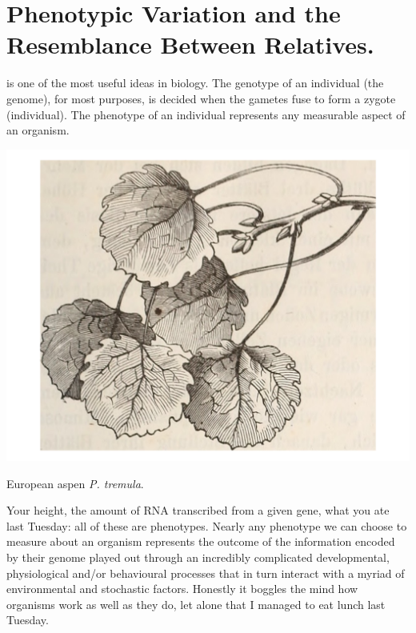 \chapter{Phenotypic Variation and the Resemblance Between Relatives.}

 is one of the most useful ideas in biology.\cite{Johannsen:1911} 
The genotype of an individual (the genome), for most purposes, is decided when
the gametes fuse to form a zygote (individual). The phenotype of an individual represents any
measurable aspect of an organism. \begin{marginfigure}
\begin{center}
\includegraphics[width=0.8 \textwidth]{illustration_images/Quant_gen/Aspen_budset/Aspen_leaves.pdf}
\end{center}
\caption{European aspen {\it P. tremula}.  } \label{fig:Apsen}
\end{marginfigure}   Your height, the amount of
RNA transcribed from a given gene, what you ate last Tuesday: all
of these are phenotypes.  Nearly any phenotype we can choose to measure about an organism represents the outcome of the information encoded by their genome played out through an incredibly complicated
developmental, physiological and/or behavioural processes that in turn interact with a myriad of environmental and
stochastic factors. Honestly it boggles the mind how organisms work as well as they do, let alone that I managed to eat lunch last Tuesday. 


